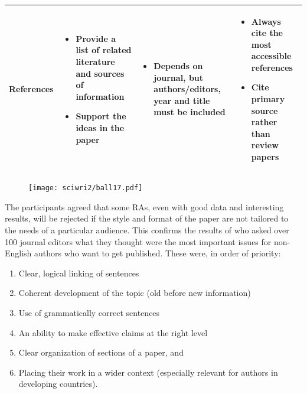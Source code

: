 \documentclass[graybox,envcountchap,sectrefs,UStrade]{svmono}
\begin{document}
{\begin{table}
\begin{tabular}{m{}m{}m{}m{}}
References & \begin{itemize} \item Provide a list of related literature and sources of information \item Support the ideas in the paper \end{itemize} &
\begin{itemize} \item Depends on journal, but authors/editors, year and title must be included \end{itemize} &
\begin{itemize}
    \item Always cite the most accessible references
    \item Cite primary source rather than review papers
\end{itemize} \\
\bottomrule
\end{tabular}
\end{table}
}

\begin{figure}
\vspace{-20pt}
\texttt{[image: sciwri2/ball17.pdf]}
\vspace{-20pt}
\end{figure}

The participants agreed that some RAs, even with good data and interesting results, will be rejected if the style and format of the paper are not tailored to the needs of a particular audience. This confirms the results of \citet[Fig.1]{Gosden1992} who asked over 100 journal editors what they thought were the most important issues for non-English authors who want to get published. These were, in order of priority:

\begin{enumerate}
    \item Clear, logical linking of sentences
    \item Coherent development of the topic (old before new information)
    \item Use of grammatically correct sentences
    \item An ability to make effective claims at the right level
    \item Clear organization of sections of a paper, and
    \item Placing their work in a wider context (especially relevant for authors in developing countries).
\end{enumerate}
\end{document}
